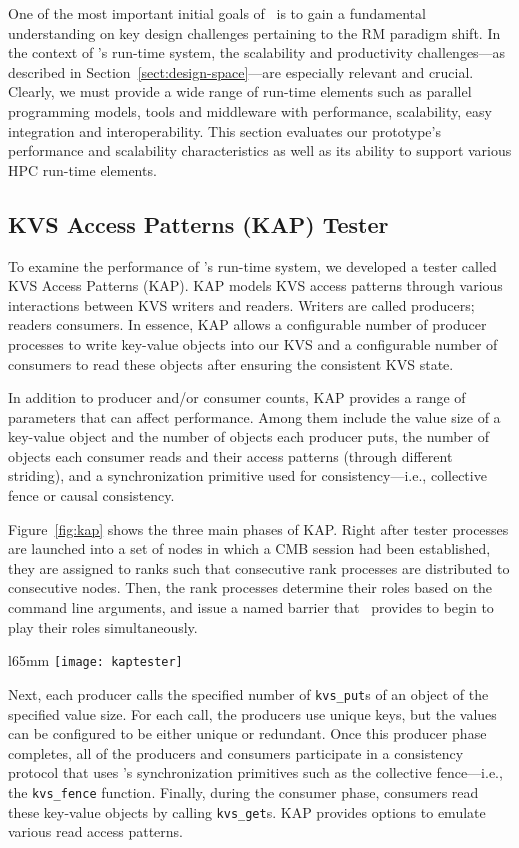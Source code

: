 One of the most important initial goals of \flux\ is to gain
a fundamental understanding on key design challenges pertaining
to the RM paradigm shift.
In the context of \flux's run-time system, the scalability
and productivity challenges---as described
in Section~\ref{sect:design-space}---are especially
relevant and crucial. Clearly, we  must provide a wide range
of run-time elements such as parallel programming models,
tools and middleware with performance, scalability, easy integration
and interoperability.
This section evaluates our prototype's performance
and scalability characteristics as well as its ability
to support various HPC run-time elements.


\subsection{KVS Access Patterns (KAP) Tester}
To examine the performance of \flux's run-time system,
we developed a tester called KVS Access Patterns (KAP).
KAP models KVS access patterns through various interactions
between KVS writers and readers. Writers are called producers;
readers consumers.
In essence, KAP allows a configurable number of producer processes
to write key-value objects into our KVS 
and a configurable number of consumers to read these
objects after ensuring the consistent KVS state.

In addition to producer and/or consumer counts,
KAP provides a range of parameters that can affect performance.
Among them include the value size of a key-value object
and the number of objects each producer puts,
the number of objects each consumer reads and their
access patterns (through different striding), and
a synchronization primitive used for consistency---i.e., 
collective fence or causal consistency. 

Figure~\ref{fig:kap} shows the three main phases of KAP.
Right after tester processes are launched into a set of nodes
in which a CMB session had been established,
they are assigned to ranks such that consecutive rank
processes are distributed to consecutive nodes.
Then, the rank processes determine their roles based
on the command line arguments, and issue a named barrier
that \flux\ provides to begin to play their roles
simultaneously.

\begin{wrapfigure}{l}{65mm}
  \centering
  \texttt{[image: kaptester]}
  \caption{Main Phases of KAP Tester}
  \label{fig:kap}
\end{wrapfigure}


Next, each producer calls the specified number of
{\tt kvs\_put}s of an object of the specified value size.
For each call, the producers use unique keys, but
the values can be configured to be either unique
or redundant.
Once this producer phase completes, all of the producers and consumers
participate in a consistency protocol that uses
\flux's synchronization primitives such as the collective
fence---i.e., the {\tt kvs\_fence} function.
Finally, during the consumer phase, consumers read
these key-value objects by calling {\tt kvs\_get}s.
KAP provides options to emulate various read access
patterns.

